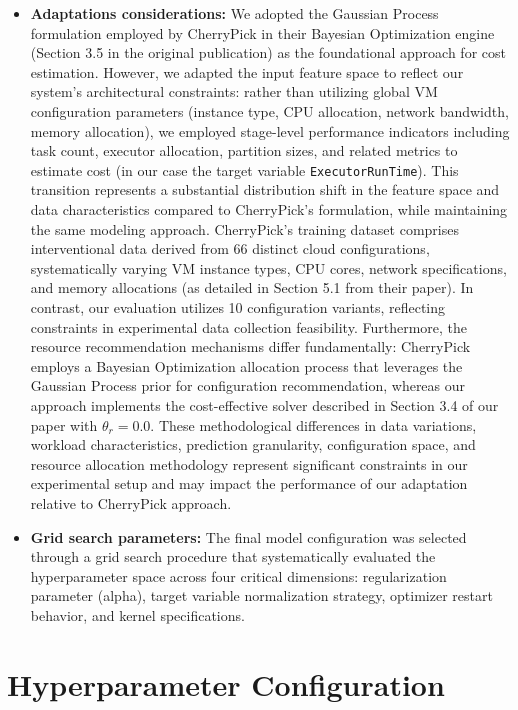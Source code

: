 \begin{itemize}
    \item \textbf{Adaptations considerations:} We adopted the Gaussian Process formulation employed by CherryPick in their Bayesian Optimization engine (Section 3.5 in the original publication) as the foundational approach for cost estimation. However, we adapted the input feature space to reflect our system's architectural constraints: rather than utilizing global VM configuration parameters (instance type, CPU allocation, network bandwidth, memory allocation), we employed stage-level performance indicators including task count, executor allocation, partition sizes, and related metrics to estimate cost (in our case the target variable \texttt{ExecutorRunTime}). This transition represents a substantial distribution shift in the feature space and data characteristics compared to CherryPick's formulation, while maintaining the same modeling approach. CherryPick's training dataset comprises interventional data derived from 66 distinct cloud configurations, systematically varying VM instance types, CPU cores, network specifications, and memory allocations (as detailed in Section 5.1 from their paper). In contrast, our evaluation utilizes 10 configuration variants, reflecting constraints in experimental data collection feasibility. Furthermore, the resource recommendation mechanisms differ fundamentally: CherryPick employs a Bayesian Optimization allocation process that leverages the Gaussian Process prior for configuration recommendation, whereas our approach implements the cost-effective solver described in Section 3.4 of our paper with $\theta_r = 0.0$. These methodological differences in data variations, workload characteristics, prediction granularity, configuration space, and resource allocation methodology represent significant constraints in our experimental setup and may impact the performance of our adaptation relative to CherryPick approach.
    \item \textbf{Grid search parameters:} The final model configuration was selected through a grid search procedure that systematically evaluated the hyperparameter space across four critical dimensions: regularization parameter (alpha), target variable normalization strategy, optimizer restart behavior, and kernel specifications.
\end{itemize}

\section{Hyperparameter Configuration}

